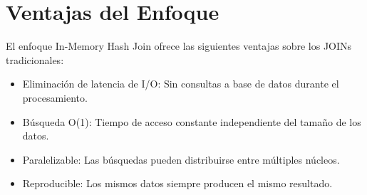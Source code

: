 \bigskip

\section{Ventajas del Enfoque}

El enfoque In-Memory Hash Join ofrece las siguientes ventajas sobre los JOINs tradicionales:

\bigskip

\begin{itemize}
    \item Eliminación de latencia de I/O: Sin consultas a base de datos durante el procesamiento.
    \item Búsqueda O(1): Tiempo de acceso constante independiente del tamaño de los datos.
    \item Paralelizable: Las búsquedas pueden distribuirse entre múltiples núcleos.
    \item Reproducible: Los mismos datos siempre producen el mismo resultado.
\end{itemize}

\vfill
\newpage

